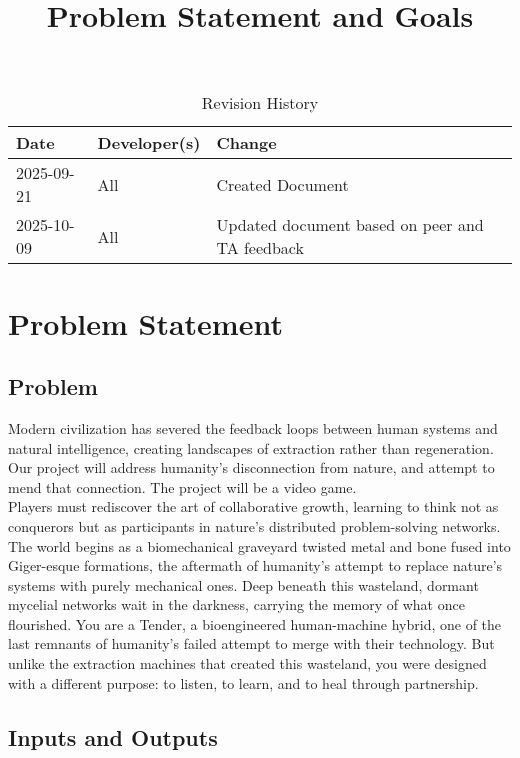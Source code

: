 \documentclass{article}
\title{Problem Statement and Goals\\\progname}
\author{\authname}
\date{}
\begin{document}
\maketitle

\begin{table}[hp]
\caption{Revision History} \label{TblRevisionHistory}
\begin{tabularx}{\textwidth}{llX}
\toprule
\textbf{Date} & \textbf{Developer(s)} & \textbf{Change}\\
\midrule
2025-09-21 & All & Created Document\\
2025-10-09 & All & Updated document based on peer and TA feedback\\
\bottomrule
\end{tabularx}
\end{table}

\section{Problem Statement}

\subsection{Problem}

Modern civilization has severed the feedback loops between human systems and natural intelligence, creating landscapes of extraction rather than regeneration. Our project will address humanity’s disconnection from nature, and attempt to mend that connection. The project will be a video game.\\

Players must rediscover the art of collaborative growth, learning to think not as conquerors but as participants in nature's distributed problem-solving networks. The world begins as a biomechanical graveyard twisted metal and bone fused into Giger-esque formations, the aftermath of humanity's attempt to replace nature's systems with purely mechanical ones. Deep beneath this wasteland, dormant mycelial networks wait in the darkness, carrying the memory of what once flourished. You are a Tender, a bioengineered human-machine hybrid, one of the last remnants of humanity's failed attempt to merge with their technology. But unlike the extraction machines that created this wasteland, you were designed with a different purpose: to listen, to learn, and to heal through partnership.\\


\subsection{Inputs and Outputs}
\end{document}
